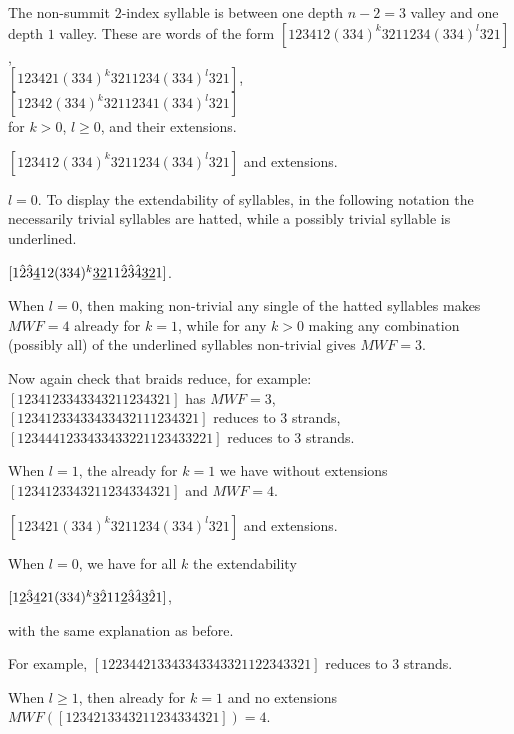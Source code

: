 \begin{caselist}
\begin{caselist}
\case The non-summit $2$-index syllable is between
one depth $n-2=3$ valley and one depth $1$ valley. These are words
of the form $[123412(334)^k3211234(334)^l321]$, \\
$[123421(334)^k3211234(334)^l321]$,\\
$[12342(334)^k32112341(334)^l321]$ \\
for $k>0$, $l\ge 0$, and their extensions.

\begin{caselist}
\case $[123412(334)^k3211234(334)^l321]$ and extensions.

\begin{caselist}
\case $l=0$. To display the extendability of syllables,
in the following notation the necessarily trivial syllables are
hatted, while a possibly trivial syllable is underlined.

$[1\hat 2\hat 3\underline 412(334)^k\underline 3\underline 211\hat 2\hat 3\hat 4\underline 3\underline 21]$. 

When $l=0$, then making non-trivial any single of the hatted syllables
makes $MWF=4$ already for $k=1$, while for any $k>0$ making any
combination (possibly all) of the underlined syllables non-trivial
gives $MWF=3$.

Now again check that braids reduce, for example: \\ 
$[1234123343343211234321]$ has $MWF=3$, \\
$[12341233433433432111234321]$ reduces to 3 strands, \\
$[1234441233433433221123433221]$ reduces to 3 strands.


\case 
When $l=1$, the already for $k=1$ we have without extensions
$[1234123343211234334321]$ and $MWF=4$.
\end{caselist}

\case $[123421(334)^k3211234(334)^l321]$ and extensions.

\begin{caselist}
\case When $l=0$, we have for all $k$ the extendability

$[1\underline 2\hat 3\underline 421(334)^k\underline 3\hat 211\underline 2\hat 3\hat 4\underline 3\hat 21]$,

with the same explanation as before.

For example, $[122344213343343343321122343321]$ reduces to 3 strands.

\case When $l\ge 1$, then already for $k=1$ and no extensions
$MWF([1234213343211234334321])=4$.

\end{caselist}


\end{caselist}
\end{caselist}
\end{caselist}

